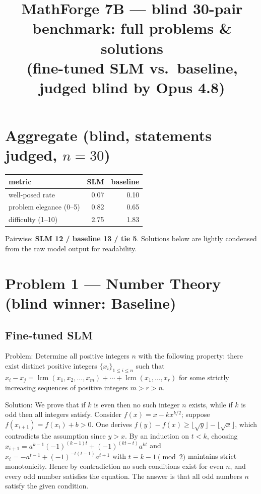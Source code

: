 \documentclass[11pt]{article}
\title{MathForge 7B --- blind 30-pair benchmark: full problems \& solutions\\ (fine-tuned SLM vs.\ baseline, judged blind by Opus 4.8)}\date{}
\begin{document}
\maketitle

\section*{Aggregate (blind, statements judged, $n=30$)}

\begin{tabular}{lrr} metric & SLM & baseline \\ \hline

well-posed rate & 0.07 & 0.10 \\ problem elegance (0--5) & 0.82 & 0.65 \\ difficulty (1--10) & 2.75 & 1.83 \\ \end{tabular}

\medskip Pairwise: \textbf{SLM 12 / baseline 13 / tie 5}. Solutions below are lightly condensed from the raw model output for readability.

\bigskip

\section*{Problem 1 --- Number Theory \quad(blind winner: Baseline)}

\subsection*{Fine-tuned SLM}

Problem:
Determine all positive integers $n$ with the following property: there exist distinct positive integers $\{ x_{i} \}_{1 \leq i \leq n}$ such that $x_{i}-x_{j}=\operatorname{lcm}(x_{1},x_{2}, \ldots, x_{m})+\cdots+\operatorname{lcm}(x_{1}, \ldots, x_{r})$ for some strictly increasing sequences of positive integers $m>r>n$.

Solution:
We prove that if $k$ is even then no such integer $n$ exists, while if $k$ is odd then all integers satisfy. Consider $f(x)=x-kx^{k/2}$; suppose $f(x_{i+1})=f(x_i)+b>0$. One derives $f(y)-f(x) \ge \lfloor \sqrt{y} \rfloor - \lfloor \sqrt{x} \rfloor$, which contradicts the assumption since $y>x$. By an induction on $t<k$, choosing $x_{i+1}=a^{k-1}(-1)^{(k-1)t}+(-1)^{(kt-t)}a^{kt}$ and $x_i=-a^{t-1}+(-1)^{-t(t-1)}a^{t+1}$ with $t \equiv k-1 \pmod 2$ maintains strict monotonicity. Hence by contradiction no such conditions exist for even $n$, and every odd number satisfies the equation. The answer is that all odd numbers $n$ satisfy the given condition.
\end{document}
